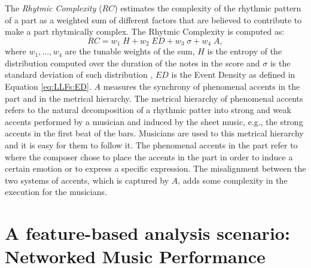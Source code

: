 The \textit{Rhytmic Complexity} ($RC$) \cite{povel} estimates the complexity of the rhythmic pattern of a part as a weighted sum of different factors that are believed to contribute to make a part rhytmically complex. The Rhytmic Complexity is computed as: 
\begin{equation}\label{eq:RC}
RC= w_1 \; H + w_2 \; ED + w_3 \; \sigma + w_4 \; A,
\end{equation}
where $w_1, \ldots, w_4$ are the tunable weights of the sum, $H$ is the entropy of the distribution computed over the duration of the notes in the score and $\sigma$ is the standard deviation of such distribution  \cite{eerola2003}, $ED$ is the Event Density as defined in Equation \ref{eq:LLFs:ED}. $A$ measures the synchrony of phenomenal accents in the part and in the metrical hierarchy. The metrical hierarchy of phenomenal accents refers to the natural decomposition of a rhythmic patter into strong and weak accents performed by a musician and induced by the sheet music, e.g., the strong accents in the first beat of the bars. Musicians are used to this metrical hierarchy and it is easy for them to follow it. The phenomenal accents in the part refer to where the composer chose to place the accents in the part in order to induce a certain emotion or to express a specific expression. The misalignment between the two systems of accents, which is captured by $A$, adds some complexity in the execution for the musicians.
%
\section{A feature-based analysis scenario: Networked Music Performance}
\label{sec:NMP}


